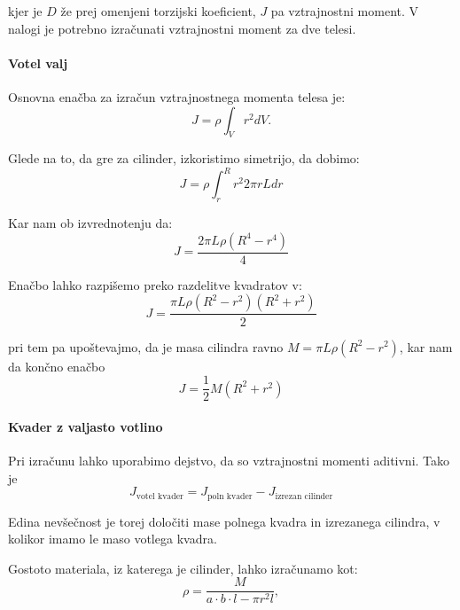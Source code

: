 \documentclass{article}
\begin{document}
kjer je $ D $ že prej omenjeni torzijski koeficient, $ J $ pa vztrajnostni moment. V nalogi je potrebno izračunati vztrajnostni moment za dve telesi.

\paragraph{Votel valj}

Osnovna enačba za izračun vztrajnostnega momenta telesa je:
\begin{equation*}
   J = \rho \int_V r^{2} d V.
\end{equation*}

Glede na to, da gre za cilinder, izkoristimo simetrijo, da dobimo:
\begin{equation*}
    J = \rho \int_r^{R} r^{2} 2 \pi r L dr
\end{equation*}

Kar nam ob izvrednotenju da:
\begin{equation*}
    J = \frac{2 \pi L \rho (R^{4} - r^{4})}{4}
\end{equation*}

Enačbo lahko razpišemo preko razdelitve kvadratov v:
\begin{equation*}
    J = \frac{\pi L \rho (R^{2} - r^{2})(R^{2} + r^{2})}{2}
\end{equation*}

pri tem pa upoštevajmo, da je masa cilindra ravno $ M = \pi L \rho (R^{2} - r^{2}) $, kar nam da končno enačbo
\begin{equation} \label{eq:1}
    J = \frac{1}{2} M (R^{2} + r^{2})
\end{equation}

\paragraph{Kvader z valjasto votlino}

Pri izračunu lahko uporabimo dejstvo, da so vztrajnostni momenti aditivni. Tako je 
\begin{equation*}
    J_\text{votel kvader} = J_{\text{poln kvader}} - J_{\text{izrezan cilinder}}
\end{equation*}

Edina nevšečnost je torej določiti mase polnega kvadra in izrezanega cilindra, v kolikor imamo le maso votlega kvadra. 

Gostoto materiala, iz katerega je cilinder, lahko izračunamo kot:
\begin{equation*}
    \rho = \frac{M}{a \cdot b \cdot l - \pi r^{2} l},
\end{equation*}
\end{document}
